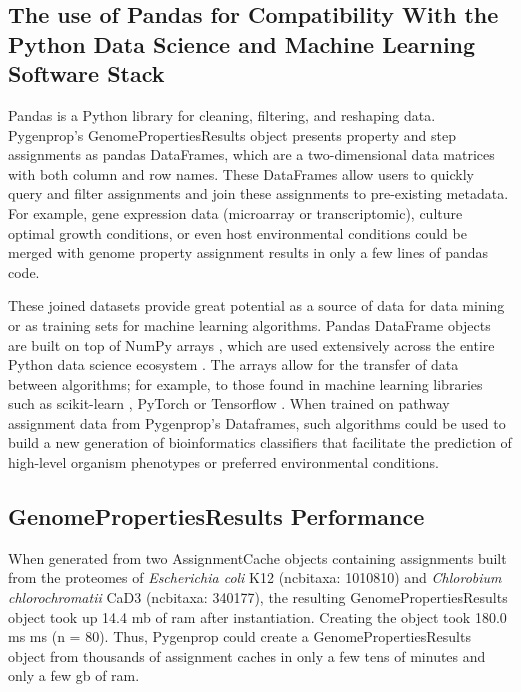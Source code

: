 \subsection{The use of Pandas for Compatibility With the Python Data Science and 
Machine Learning Software Stack}

Pandas is a Python library for cleaning, filtering, and reshaping data. 
Pygenprop's GenomePropertiesResults object presents property and step 
assignments as pandas DataFrames, which are a two-dimensional data matrices with 
both column and row names. These DataFrames allow users to quickly query and 
filter assignments and join these assignments to pre-existing metadata. For 
example, gene expression data (microarray or transcriptomic), culture optimal 
growth conditions, or even host environmental conditions could be merged with 
genome property assignment results in only a few lines of pandas code.

These joined datasets provide great potential as a source of data for data 
mining or as training sets for machine learning algorithms. Pandas DataFrame 
objects are built on top of NumPy arrays \cite{mckinney2010data}, which are used 
extensively across the entire Python data science ecosystem \cite{scipystack}. 
The arrays allow for the transfer of data between algorithms; for example, to 
those found in machine learning libraries such as \gls{scikit}-learn 
\cite{pedregosa2011scikit}, PyTorch \cite{Paszke2017} or Tensorflow 
\cite{abadi2016tensorflow}.  When trained on pathway assignment data from 
Pygenprop's Dataframes, such algorithms could be used to build a new generation 
of bioinformatics classifiers that facilitate the prediction of high-level 
organism phenotypes or preferred environmental conditions.

\subsection{GenomePropertiesResults Performance}

When generated from two AssignmentCache objects containing assignments built 
from the proteomes of \textit{Escherichia coli} K12 (\gls{ncbitaxa}: 1010810) 
and \textit{Chlorobium chlorochromatii} CaD3 (\gls{ncbitaxa}: 340177), the 
resulting GenomePropertiesResults object took up 14.4 \gls{mb} of \gls{ram} 
after instantiation. Creating the object took 180.0 ms  ms (\gls{n} 
= 80). Thus, Pygenprop could create a GenomePropertiesResults object from 
thousands of assignment caches in only a few tens of minutes and only a few 
\gls{gb}  of \gls{ram}. 

